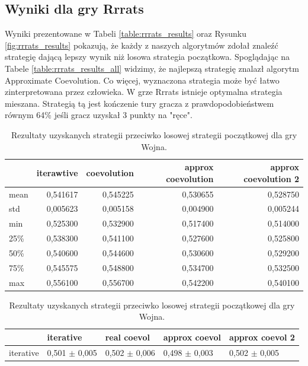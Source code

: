 \documentclass[inzynierska]{pwr_wmat_praca_dyplomowa}
\theoremstyle{plain}
\numberwithin{theorem}{chapter}
\theoremstyle{definition}
\numberwithin{theorem}{chapter}
\begin{document}
	\subsection*{Wyniki dla gry Rrrats}
	Wyniki prezentowane w Tabeli \ref{table:rrrats_results} oraz Rysunku \ref{fig:rrrats_results} pokazują, że każdy z naszych algorytmów zdołał znaleźć strategię dającą lepszy wynik niż losowa strategia początkowa. Spoglądając na Tabele \ref{table:rrrats_results_all} widzimy, że najlepszą strategię znalazł algorytm Approximate Coevolution.
	Co więcej, wyznaczona strategia może być łatwo zinterpretowana przez człowieka.
	W grze Rrrats istnieje optymalna strategia mieszana. Strategią tą jest kończenie tury gracza z prawdopodobieństwem równym 64\% jeśli gracz uzyskał 3 punkty na "ręce".
	\begin{table}
		\begin{center}
			\begin{tabular}{lrrrr}
				\toprule
				{} &  iterawtive &  coevolution &  approx coevolution &  approx coevolution 2 \\
				\midrule
				mean  &    0,541617 &     0,545225 &             0,530655 &               0,528750 \\
				std   &    0,005623 &     0,005158 &             0,004900 &               0,005244 \\
				min   &    0,525300 &     0,532900 &             0,517400 &               0,514000 \\
				25\%   &    0,538300 &     0,541100 &             0,527600 &               0,525800 \\
				50\%   &    0,540600 &     0,544600 &             0,530600 &               0,529200 \\
				75\%   &    0,545575 &     0,548800 &             0,534700 &               0,532500 \\
				max   &    0,556100 &     0,556700 &             0,542200 &               0,540100 \\
				\bottomrule
			\end{tabular}
			\caption{Rezultaty uzyskanych strategii przeciwko losowej strategii początkowej dla gry Wojna.}
			\label{table:war_results}
		\end{center}
		\begin{center}
			\begin{tabular}{lllll}
				\toprule
				{} &        iterative &      real coevol &    approx coevol &  approx coevol 2 \\
				\midrule
				iterative       &  0,501 $\pm$ 0,005 &  0,502 $\pm$ 0,006 &  0,498 $\pm$ 0,003 &  0,502 $\pm$ 0,005 \\

\end{tabular}
\end{center}
\end{table}
\end{document}
